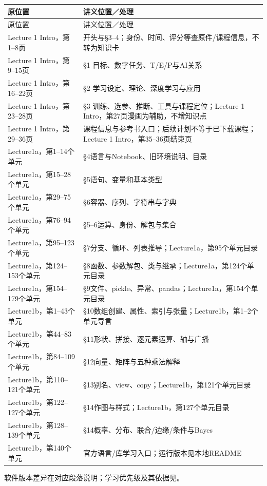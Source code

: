 \begingroup
\small\setlength{\tabcolsep}{3pt}
\renewcommand{\arraystretch}{1.22}
\begin{longtable}{@{}>{\raggedright\arraybackslash}p{}>{\raggedright\arraybackslash}p{}@{}}
\toprule
原位置 & 讲义位置／处理 \\
\midrule\endfirsthead
原位置 & 讲义位置／处理 \\
\midrule\endhead
\bottomrule\endfoot
Lecture 1 Intro，第1–8页 & 开头与§3–4；身份、时间、评分等查原件/课程信息，不转为知识卡 \\
Lecture 1 Intro，第9–15页 & §1 目标、数字任务、T/E/P与AI关系 \\
Lecture 1 Intro，第16–22页 & §2 学习设定、理论、深度学习与应用 \\
Lecture 1 Intro，第23–28页 & §3 训练、选参、推断、工具与课程定位；Lecture 1 Intro，第27页漫画为辅助，不增知识点 \\
Lecture 1 Intro，第29–36页 & 课程信息与参考书入口；后续计划不等于已下载课程；Lecture 1 Intro，第35–36页结束页 \\
Lecture1a，第1–14个单元 & §4语言与Notebook、旧环境说明、目录 \\
Lecture1a，第15–28个单元 & §5语句、变量和基本类型 \\
Lecture1a，第29–75个单元 & §6容器、序列、字符串与字典 \\
Lecture1a，第76–94个单元 & §5–6运算、身份、解包与集合 \\
Lecture1a，第95–123个单元 & §7分支、循环、列表推导；Lecture1a，第95个单元目录 \\
Lecture1a，第124–153个单元 & §8函数、参数解包、类与继承；Lecture1a，第124个单元目录 \\
Lecture1a，第154–179个单元 & §9文件、pickle、异常、pandas；Lecture1a，第154个单元目录 \\
Lecture1b，第1–43个单元 & §10数组创建、属性、索引与张量；Lecture1b，第1–2个单元导言 \\
Lecture1b，第44–83个单元 & §11形状、拼接、逐元素运算、轴与广播 \\
Lecture1b，第84–109个单元 & §12向量、矩阵与五种乘法解释 \\
Lecture1b，第110–121个单元 & §13别名、view、copy；Lecture1b，第121个单元目录 \\
Lecture1b，第122–127个单元 & §14作图与样式；Lecture1b，第127个单元目录 \\
Lecture1b，第128–139个单元 & §14概率、分布、联合/边缘/条件与Bayes \\
Lecture1b，第140个单元 & 官方语言/库学习入口；运行版本见本地README \\
\end{longtable}
\endgroup


软件版本差异在对应段落说明；学习优先级及其依据见。
